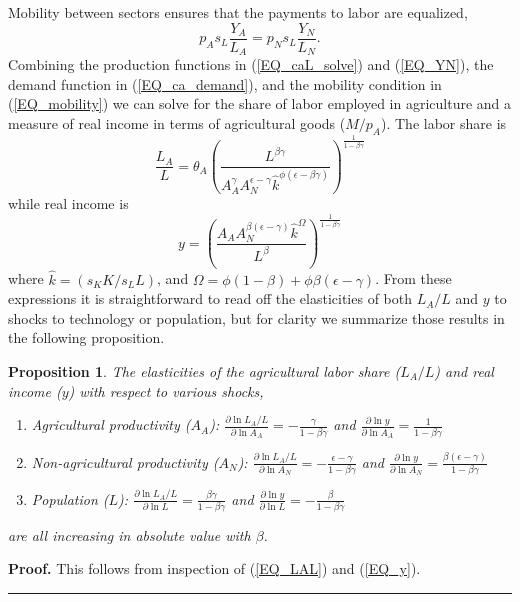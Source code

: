 \documentclass[11pt]{article}
\newtheorem{proposition}{Proposition}
\newenvironment{proof}[1][Proof]{\noindent\textbf{#1.} }{\ \rule{0.5em}{0.5em}}
\begin{document}
Mobility between sectors ensures that the payments to labor are equalized,
\begin{equation}
    p_A s_L \frac{Y_A}{L_A} = p_N s_L \frac{Y_N}{L_N}. \label{EQ_mobility}
\end{equation}
Combining the production functions in (\ref{EQ_caL_solve}) and (\ref{EQ_YN}), the demand function in (\ref{EQ_ca_demand}), and the mobility condition in (\ref{EQ_mobility}) we can solve for the share of labor employed in agriculture and a measure of real income in terms of agricultural goods ($M/p_A$). The labor share is
\begin{equation}
	\frac{L_A}{L} = \theta_A \left(\frac{L^{\beta\gamma}}{A_A^{\gamma} A_N^{\epsilon - \gamma} \hat{k}^{\phi(\epsilon - \beta\gamma)}}\right)^{\frac{1}{1-\beta\gamma}} \label{EQ_LAL}
\end{equation}
while real income is
\begin{equation}
	y = \left(\frac{A_A A_N^{\beta(\epsilon-\gamma)}\hat{k}^{\Omega}}{L^{\beta}} \right)^{\frac{1}{1-\beta\gamma}} \label{EQ_y}
\end{equation}
where $\hat{k} = (s_K K/s_L L)$, and $\Omega = \phi(1-\beta) + \phi\beta(\epsilon-\gamma)$. From these expressions it is straightforward to read off the elasticities of both $L_A/L$ and $y$ to shocks to technology or population, but for clarity we summarize those results in the following proposition. 

\begin{proposition}
The elasticities of the agricultural labor share ($L_A/L$) and real income ($y$) with respect to various shocks,
\begin{enumerate}
	\item[(a)] Agricultural productivity ($A_A$): $\frac{\partial \ln L_A/L}{\partial \ln A_A} = - \frac{\gamma}{1-\beta\gamma}$ and $\frac{\partial \ln y}{\partial \ln A_A} = \frac{1}{1-\beta\gamma}$
	\item[(b)] Non-agricultural productivity ($A_N$): $\frac{\partial \ln L_A/L}{\partial \ln A_N} = - \frac{\epsilon-\gamma}{1-\beta\gamma}$ and $\frac{\partial \ln y}{\partial \ln A_N} = \frac{\beta(\epsilon-\gamma)}{1-\beta\gamma}$
	\item[(c)] Population ($L$): $\frac{\partial \ln L_A/L}{\partial \ln L} = \frac{\beta\gamma}{1-\beta\gamma}$ and $\frac{\partial \ln y}{\partial \ln L} = - \frac{\beta}{1-\beta\gamma}$
\end{enumerate}
are all increasing in absolute value with $\beta$.
\end{proposition}
\begin{proof}
This follows from inspection of (\ref{EQ_LAL}) and (\ref{EQ_y}).
\end{proof}
\end{document}
